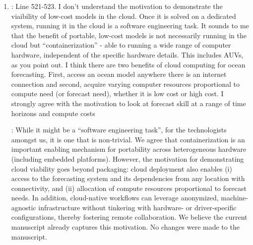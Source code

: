 \documentclass[a4paper]{article}
\begin{document}
\begin{answers}
\begin{enumerate}
    \action: Thank you for the comment. The value $0.0035^\circ$
    refers to the statistical model's horizontal grid spacing, not to
    the spacing between AUV profiles or surfacings. An AUV profile
    here corresponds to a yo-yo trajectory: the vehicle advances
    horizontally while descending and ascending, while sampling
    continuously. Thus, while the along-track distance between
    surfacings for a 100\,m yo-yo at a maximum pitch of $15^\circ$ is
    on the order of $\sim 0.75$--$0.8$\,km, the sample spacing along
    the trajectory is much smaller. This is why we state that AUV
    sampling is denser than the model grid spacing. We revised the
    manuscript sentence accordingly to make this explicit in the
    following way:

    \begin{quote}

      With AUV sampling denser than the model horizontal grid
      resolution \ldots

    \end{quote}

  \item

    \reply: Line 521-523. I don’t understand the motivation to
    demonstrate the viaibility of low-cost models in the cloud. Once it
    is solved on a dedicated system, running it in the cloud is a
    software engineering task. It sounds to me that the benefit of
    portable, low-cost models is not necessarily running in the cloud
    but “containerization” - able to running a wide range of computer
    hardware, independent of the specific hardware details. This
    includes AUVs, as you point out. I think there are two benefits of
    cloud computing for ocean forecasting. First, access an ocean model
    anywhere there is an internet connection and second, acquire varying
    computer resources proportional to compute need (or forecast need),
    whether it is low cost or high cost. I strongly agree with the
    motivation to look at forecast skill at a range of time horizons and
    compute costs

    \action: While it might be a ``software engineering task'', for
    the technologists amongst us, it is one that is non-trivial. We
    agree that containerization is an important enabling mechanism for
    portability across heterogeneous hardware (including embedded
    platforms). However, the motivation for demonstrating cloud
    viability goes beyond packaging: cloud deployment also enables (i)
    access to the forecasting system and its dependencies from any
    location with connectivity, and (ii) allocation of compute
    resources proportional to forecast needs. In addition,
    cloud-native workflows can leverage anonymized, machine-agnostic
    infrastructure without tinkering with hardware- or driver-specific
    configurations, thereby fostering remote collaboration. We believe
    the current manuscript already captures this motivation. No
    changes were made to the manuscript. 


  \end{enumerate}

\end{answers}



\footnotesize{
  
}

\end{document}
